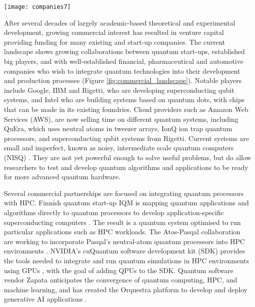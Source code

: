 \documentclass[10pt]{iopart}
\begin{document}
\begin{figure*}[ht!]
\centering
\texttt{[image: companies7]}
\caption{Quantum computing commercial landscape. Some examples of companies (blue) partnered with quantum tech companies (orange) to advance QC research. Cambridge Quantum Computing (CQC) and Honeywell now merged as Quantinuum (red). We include CQC, Honeywell and Quantinuum separately as some collaborations were formed before the merger in Dec 2021. Universities, research institutes and government organisations not shown. Compiled by R. Au-Yeung from press releases and publicly disclosed interactions with end users.}
\label{fig:commercial_landscape}
\end{figure*}

After several decades of largely academic-based theoretical and experimental development, growing commercial interest has resulted in venture capital \cite{MacQuarrie2020,Gibney2019,Bova2021} providing funding for many existing and start-up companies. The current landscape shows growing collaborations between quantum start-ups, established big players, and with well-established financial, pharmaceutical and automotive companies who wish to integrate quantum technologies into their development and production processes (Figure \ref{fig:commercial_landscape}). Notable players include Google, IBM and Rigetti, who are developing superconducting qubit systems, and Intel who are building systems based on quantum dots, with chips that can be made in its existing foundries. Cloud providers such as Amazon Web Services (AWS), are now selling time on different quantum systems, including QuEra, which uses neutral atoms in tweezer arrays, IonQ ion trap quantum processors, and superconducting qubit systems from Rigetti. Current systems are small and imperfect, known as noisy, intermediate scale quantum computers (NISQ) \cite{Preskill2018,Bharti2022}. They are not yet powerful enough to solve useful problems, but do allow researchers to test and develop quantum algorithms and applications to be ready for more advanced quantum hardware.

Several commercial partnerships are focused on integrating quantum processors with HPC. Finnish quantum start-up IQM is mapping quantum applications and algorithms directly to quantum processors to develop application-specific superconducting computers \cite{IQMtech}. The result is a quantum system optimised to run particular applications such as HPC workloads. The Atos-Pasqal collaboration are working to incorporate Pasqal's neutral-atom quantum processors into HPC environments \cite{Atos2020}. NVIDIA's cuQuantum software development kit (SDK) provides the tools needed to integrate and run quantum simulations in HPC environments using GPUs \cite{NVIDIAcuQuantum2022}, with the goal of adding QPUs to the SDK. Quantum software vendor Zapata anticipates the convergence of quantum computing, HPC, and machine learning, and has created the Orquestra platform to develop and deploy generative AI applications \cite{ZapataOrquestra}.
\end{document}
